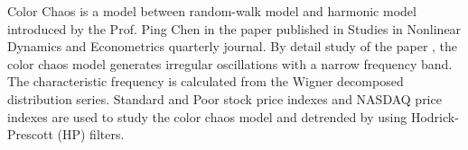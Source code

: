 Color Chaos is a model between random-walk model and harmonic model introduced by the Prof. Ping Chen in the paper \cite{pchen} published in Studies in Nonlinear Dynamics and Econometrics quarterly journal. By detail study of the paper \cite{pchen}, the color chaos model generates irregular oscillations with a narrow frequency band. The characteristic frequency is calculated from the Wigner decomposed distribution series. Standard and Poor stock price indexes and NASDAQ price indexes are used to study the color chaos model and detrended by using Hodrick-Prescott (HP) filters.
